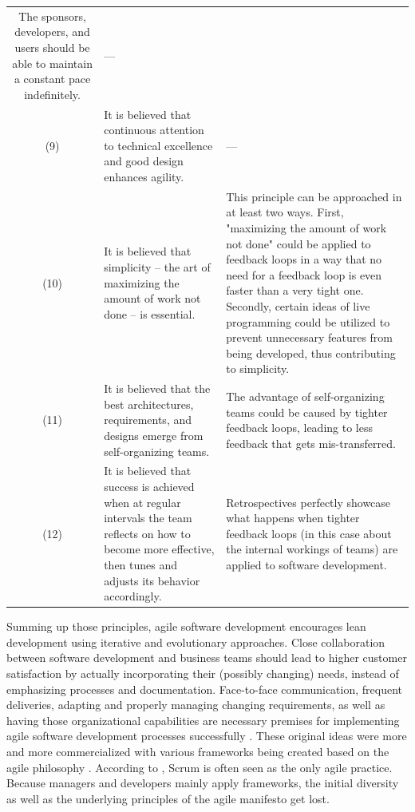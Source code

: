 \begin{block}
\begin{ThreePartTable}
\begin{longtable}{@{}cp{}p{}@{}}
    The sponsors, developers, and users should be able to maintain a constant pace indefinitely.&
    ---
    \\
    (9) &
    It is believed that continuous attention to technical excellence and good design enhances agility.&
    ---
    \\
    (10) &
    It is believed that simplicity – the art of maximizing the amount of work not done – is essential.&
    This principle can be approached in at least two ways.
    First, "maximizing the amount of work not done" could be applied to feedback loops in a way that no need for a feedback loop is even faster than a very tight one.
    Secondly, certain ideas of live programming could be utilized to prevent unnecessary features from being developed, thus contributing to simplicity.
    \\
    (11) &
    It is believed that the best architectures, requirements, and designs emerge from self-organizing teams.&
    The advantage of self-organizing teams could be caused by tighter feedback loops, leading to less feedback that gets mis-transferred.
    \\
    (12)&
    It is believed that success is achieved when at regular intervals the team reflects on how to become more effective, then tunes and adjusts its behavior accordingly.&
    Retrospectives perfectly showcase what happens when tighter feedback loops (in this case about the internal workings of teams) are applied to software development.
    \\
    \bottomrule
\end{longtable}
\end{ThreePartTable}
\end{block}

Summing up those principles, agile software development encourages lean development using iterative and evolutionary approaches.
Close collaboration between software development and business teams should lead to higher customer satisfaction by actually incorporating their (possibly changing) needs, instead of emphasizing processes and documentation.
Face-to-face communication, frequent deliveries, adapting and properly managing changing requirements, as well as having those organizational capabilities are necessary premises for implementing agile software development processes successfully \cite{misra_agile_2012}.
These original ideas were more and more commercialized with various frameworks being created based on the agile philosophy \cite{hohl_back_2018}.
According to \citeauthor{hohl_back_2018}, Scrum is often seen as the only agile practice.
Because managers and developers mainly apply frameworks, the initial diversity as well as the underlying principles of the agile manifesto get lost.


